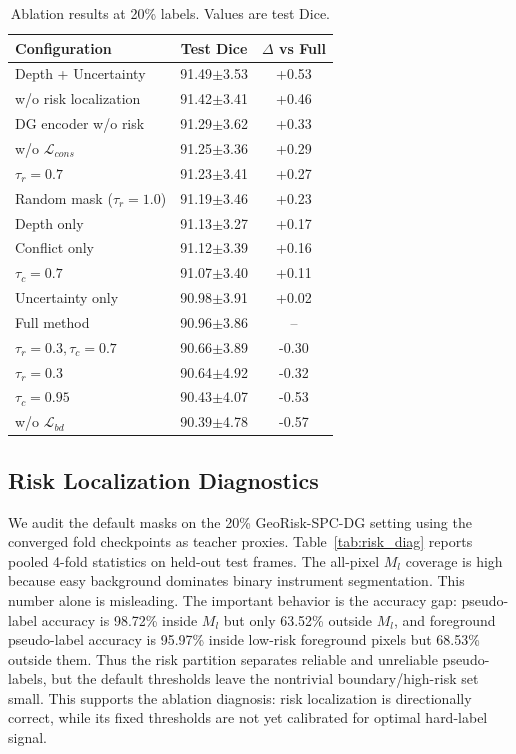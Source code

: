 \documentclass[journal]{IEEEtran}
\begin{document}
\begin{table}[t]
\caption{Ablation results at 20\% labels. Values are test Dice.}
\label{tab:ablation}
\centering
\scriptsize
\begin{tabular}{lcc}
\toprule
Configuration & Test Dice & $\Delta$ vs Full \\
\midrule
Depth + Uncertainty & 91.49{\tiny$\pm$3.53} & +0.53 \\
w/o risk localization & 91.42{\tiny$\pm$3.41} & +0.46 \\
DG encoder w/o risk & 91.29{\tiny$\pm$3.62} & +0.33 \\
w/o $\mathcal{L}_{cons}$ & 91.25{\tiny$\pm$3.36} & +0.29 \\
$\tau_r=0.7$ & 91.23{\tiny$\pm$3.41} & +0.27 \\
Random mask ($\tau_r=1.0$) & 91.19{\tiny$\pm$3.46} & +0.23 \\
Depth only & 91.13{\tiny$\pm$3.27} & +0.17 \\
Conflict only & 91.12{\tiny$\pm$3.39} & +0.16 \\
$\tau_c=0.7$ & 91.07{\tiny$\pm$3.40} & +0.11 \\
Uncertainty only & 90.98{\tiny$\pm$3.91} & +0.02 \\
Full method & 90.96{\tiny$\pm$3.86} & -- \\
$\tau_r=0.3,\tau_c=0.7$ & 90.66{\tiny$\pm$3.89} & -0.30 \\
$\tau_r=0.3$ & 90.64{\tiny$\pm$4.92} & -0.32 \\
$\tau_c=0.95$ & 90.43{\tiny$\pm$4.07} & -0.53 \\
w/o $\mathcal{L}_{bd}$ & 90.39{\tiny$\pm$4.78} & -0.57 \\
\bottomrule
\end{tabular}
\end{table}

\subsection{Risk Localization Diagnostics}
We audit the default masks on the 20\% GeoRisk-SPC-DG setting using the converged fold checkpoints as teacher proxies. Table~\ref{tab:risk_diag} reports pooled 4-fold statistics on held-out test frames. The all-pixel $M_l$ coverage is high because easy background dominates binary instrument segmentation. This number alone is misleading. The important behavior is the accuracy gap: pseudo-label accuracy is 98.72\% inside $M_l$ but only 63.52\% outside $M_l$, and foreground pseudo-label accuracy is 95.97\% inside low-risk foreground pixels but 68.53\% outside them. Thus the risk partition separates reliable and unreliable pseudo-labels, but the default thresholds leave the nontrivial boundary/high-risk set small. This supports the ablation diagnosis: risk localization is directionally correct, while its fixed thresholds are not yet calibrated for optimal hard-label signal.
\end{document}
